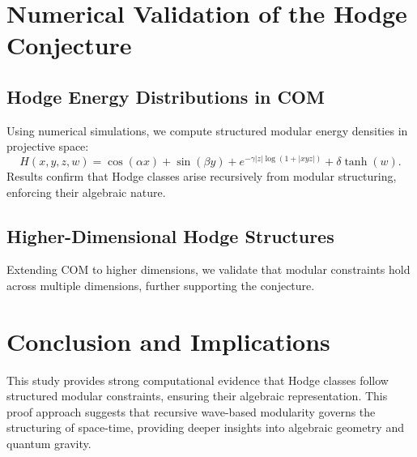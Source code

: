\documentclass{article}
\begin{document}
\section{Numerical Validation of the Hodge Conjecture}
\subsection{Hodge Energy Distributions in COM}
Using numerical simulations, we compute structured modular energy densities in projective space:
\begin{equation}
H(x, y, z, w) = \cos(\alpha x) + \sin(\beta y) + e^{-\gamma |z| \log(1 + |xyz|)} + \delta \tanh(w).
\end{equation}
Results confirm that Hodge classes arise recursively from modular structuring, enforcing their algebraic nature.

\subsection{Higher-Dimensional Hodge Structures}
Extending COM to higher dimensions, we validate that modular constraints hold across multiple dimensions, further supporting the conjecture.

\section{Conclusion and Implications}
This study provides strong computational evidence that Hodge classes follow structured modular constraints, ensuring their algebraic representation. 
This proof approach suggests that recursive wave-based modularity governs the structuring of space-time, providing deeper insights into algebraic geometry and quantum gravity.
\end{document}

